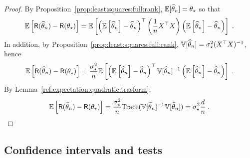 \begin{proof}
By Proposition~\ref{prop:least:squares:full:rank}, $\mathbb{E}[\widehat {\theta}_n] = \theta_\star$ so that 
$$
\mathbb{E}\left[\mathsf{R}(\widehat {\theta}_n) - \mathsf{R}(\theta_\star)\right] = \mathbb{E}\left[ \left(\mathbb{E}\left[\widehat {\theta}_n\right] - \widehat {\theta}_n\right)^\top \left(\frac{1}{n}X^\top X\right) \left(\mathbb{E}\left[\widehat {\theta}_n\right] - \widehat {\theta}_n\right)\right]\;.
$$
In addition, by Proposition~\ref{prop:least:squares:full:rank}, $\mathbb{V}[\widehat {\theta}_n] = \sigma_\star^2(X^\top X)^{-1}$, hence
$$
\mathbb{E}\left[\mathsf{R}(\widehat {\theta}_n) - \mathsf{R}(\theta_\star)\right] = \frac{\sigma_\star^2}{n}\mathbb{E}\left[ \left(\mathbb{E}\left[\widehat {\theta}_n\right] - \widehat {\theta}_n\right)^\top \mathbb{V}[\widehat {\theta}_n]^{-1} \left(\mathbb{E}\left[\widehat {\theta}_n\right] - \widehat {\theta}_n\right)\right]\;.
$$
By Lemma~\ref{ref:expectation:quadratic:trasform},
$$
\mathbb{E}\left[\mathsf{R}(\widehat {\theta}_n) - \mathsf{R}(\theta_\star)\right] = \frac{\sigma_\star^2}{n}\mathrm{Trace}(\mathbb{V}[\widehat {\theta}_n]^{-1}\mathbb{V}[\widehat {\theta}_n]) = \sigma_\star^2 \frac{d}{n}\;.
$$
\end{proof}

\subsection{Confidence intervals and tests}
